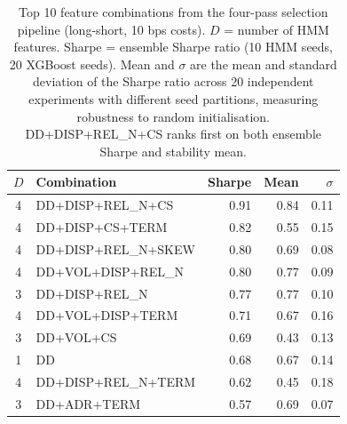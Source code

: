 \begin{table}[H]
\centering
\small
\begin{tabular}{c l r r r}
\toprule
$D$ & Combination & Sharpe & Mean & $\sigma$ \\
\midrule
4 & DD+DISP+REL\_N+CS & 0.91 & 0.84 & 0.11 \\
4 & DD+DISP+CS+TERM & 0.82 & 0.55 & 0.15 \\
4 & DD+DISP+REL\_N+SKEW & 0.80 & 0.69 & 0.08 \\
4 & DD+VOL+DISP+REL\_N & 0.80 & 0.77 & 0.09 \\
3 & DD+DISP+REL\_N & 0.77 & 0.77 & 0.10 \\
4 & DD+VOL+DISP+TERM & 0.71 & 0.67 & 0.16 \\
3 & DD+VOL+CS & 0.69 & 0.43 & 0.13 \\
1 & DD & 0.68 & 0.67 & 0.14 \\
4 & DD+DISP+REL\_N+TERM & 0.62 & 0.45 & 0.18 \\
3 & DD+ADR+TERM & 0.57 & 0.69 & 0.07 \\
\bottomrule
\end{tabular}
\caption{Top 10 feature combinations from the four-pass selection pipeline (long-short, 10 bps costs). $D$ = number of HMM features. Sharpe = ensemble Sharpe ratio (10 HMM seeds, 20 XGBoost seeds). Mean and $\sigma$ are the mean and standard deviation of the Sharpe ratio across 20 independent experiments with different seed partitions, measuring robustness to random initialisation. DD+DISP+REL\_N+CS ranks first on both ensemble Sharpe and stability mean.}
\label{tab:feature_selection}
\end{table}

